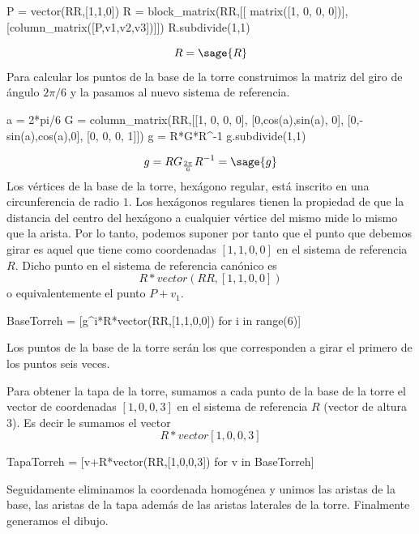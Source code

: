 \documentclass{amsart}
\begin{document}
\begin{sageblock}
P = vector(RR,[1,1,0])
R = block_matrix(RR,[[       matrix([1, 0, 0, 0])],
                     [column_matrix([P,v1,v2,v3])]])
R.subdivide(1,1)
\end{sageblock}
$$R=\sage{R}$$
Para calcular los puntos de la base de la torre construimos la matriz del 
giro de ángulo $2\pi/6$ y la pasamos al nuevo sistema de referencia.
\begin{sageblock}
a = 2*pi/6
G = column_matrix(RR,[[1,    0,     0,  0],
                     [0,cos(a),sin(a), 0],
                     [0,-sin(a),cos(a),0],
                     [0,    0,     0,  1]])
g = R*G*R^-1
g.subdivide(1,1)
\end{sageblock}
$$g=RG_{\frac{2\pi}{6}}R^{-1}=\sage{g}$$
Los vértices de la base de la torre, hexágono regular, está inscrito en una circunferencia de radio $1$. Los hexágonos regulares tienen la propiedad de que la distancia del centro del hexágono a cualquier vértice del mismo mide lo mismo que la arista. Por lo tanto, podemos suponer por tanto que el punto que debemos girar es aquel que tiene como coordenadas $[1,1,0,0]$ en el sistema de referencia $R$. Dicho punto en el sistema de referencia canónico es $$R*vector(RR,[1,1,0,0])$$ o equivalentemente el punto $P+v_1$.
\begin{sageblock}
BaseTorreh = [g^i*R*vector(RR,[1,1,0,0]) for i in range(6)]
\end{sageblock} 
Los puntos de la base de la torre serán los que corresponden a girar el primero de los puntos seis veces.


Para obtener la tapa de la torre, sumamos a cada punto de la base de la torre el vector de coordenadas $[1,0,0,3]$ en el sistema de referencia $R$ (vector de altura $3$). Es decir le sumamos el vector
 $$R*vector[1,0,0,3]$$

\begin{sageblock}
TapaTorreh = [v+R*vector(RR,[1,0,0,3]) for v in BaseTorreh] 
\end{sageblock}

Seguidamente eliminamos la coordenada homogénea y unimos las aristas de la base, las aristas de la tapa además de las aristas laterales de la torre. Finalmente generamos el dibujo.
\end{document}

